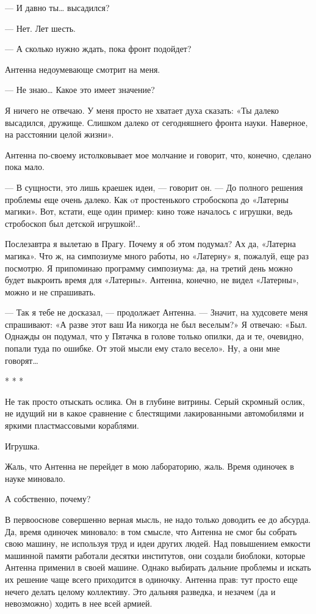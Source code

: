    — И давно ты… высадился?

   — Нет. Лет шесть.

   — А сколько нужно ждать, пока фронт подойдет?

   Антенна недоумевающе смотрит на меня.

   — Не знаю… Какое это имеет значение?

   Я ничего не  отвечаю. У меня  просто не хватает  духа сказать: «Ты  далеко
   высадился, дружище. Слишком далеко от сегодняшнего фронта науки. Наверное,
   на расстоянии целой жизни».

   Антенна по-своему  истолковывает мое  молчание  и говорит,  что,  конечно,
   сделано пока мало.

   — В сущности, это лишь  краешек идеи, — говорит  он. — До полного  решения
   проблемы еще очень  далеко. Как  oт простенького  стробоскопа до  «Латерны
   магики». Вот, кстати, еще один пример: кино тоже началось с игрушки,  ведь
   стробоскоп был детской игрушкой!..

   Послезавтра я вылетаю в Прагу. Почему  я об этом подумал? Ах да,  «Латерна
   магика». Что ж, на симпозиуме много  работы, но «Латерну» я, пожалуй,  еще
   раз посмотрю. Я припоминаю программу симпозиума: да, на третий день  можно
   будет выкроить время для «Латерны». Антенна, конечно, не видел  «Латерны»,
   можно и не спрашивать.

   — Так я  тебе не досказал,  — продолжает Антенна.  — Значит, на  худсовете
   меня спрашивают: «А разве этот ваш Иа никогда не был веселым?» Я  отвечаю:
   «Был. Однажды он подумал, что у Пятачка  в голове только опилки, да и  те,
   очевидно, попали туда по  ошибке. От этой мысли  ему стало весело». Ну,  а
   они мне говорят…

                                     * * *

   Не так просто отыскать ослика. Он в глубине витрины. Серый скромный ослик,
   не идущий ни в какое  сравнение с блестящими лакированными автомобилями  и
   яркими пластмассовыми кораблями.

   Игрушка.

   Жаль, что Антенна не  перейдет в мою лабораторию,  жаль. Время одиночек  в
   науке миновало.

   А собственно, почему?

   В первооснове  совершенно верная  мысль,  не надо  только доводить  ее  до
   абсурда. Да, время одиночек миновало: в том смысле, что Антенна не смог бы
   собрать свою машину, не используя труд и идеи других людей. Над повышением
   емкости машинной памяти работали десятки институтов, они создали биоблоки,
   которые Антенна применил в своей машине. Однако выбирать дальние  проблемы
   и искать их решение  чаще всего приходится в  одиночку. Антенна прав:  тут
   просто еще  нечего  делать  целому коллективу.  Это  дальняя  разведка,  и
   незачем (да и невозможно) ходить в нее всей армией.

